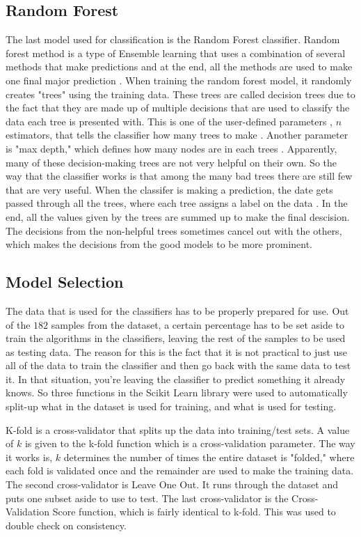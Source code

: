 \documentclass[conference,compsoc]{IEEEtran}
\begin{document}
\subsection{Random Forest}
The last model used for classification is the Random Forest classifier. Random forest method is a type of Ensemble learning that uses a combination of several methods that make predictions and at the end, all the methods are used to make one final major prediction \cite{random}. When training the random forest model, it randomly creates "trees" using the training data. 
These trees are called decision trees due to the fact that they are made up of multiple decisions that are used to classify the data each tree is presented with. This is one of the user-defined parameters , $n$ estimators, that tells the classifier how many trees to make \cite{skforest}. Another parameter is "max depth," which defines how many nodes are in each trees \cite{skforest}. Apparently, many of these decision-making trees are not very helpful on their own. So the way that the classifier works is that among the many bad trees there are still few that are very useful. When the classifer is making a prediction, the date gets passed through all the trees, where each tree assigns a label on the data \cite{random}. In the end, all the values given by the trees are summed up to make the final descision. The decisions from the non-helpful trees sometimes cancel out with the others, which makes the decisions from the good models to be more prominent.

\subsection{Model Selection}
The data that is used for the classifiers has to be properly prepared for use. Out of the $182$ samples from the dataset, a certain percentage has to be set aside to train the algorithms in the classifiers, leaving the rest of the samples to be used as testing data. The reason for this is the fact that it is not practical to just use all of the data to train the classifier and then go back with the same data to test it. In that situation, you're leaving the classifier to predict something it already knows. 
So three functions in the Scikit Learn library were used to automatically split-up what in the dataset is used for training, and what is used for testing. 

K-fold is a cross-validator that splits up the data into training/test sets. A value of $k$ is given to the k-fold function which is a cross-validation parameter. The way it works is, $k$ determines the number of times the entire dataset is "folded," where each fold is validated once and the remainder are used to make the training data. 
The second cross-validator is Leave One Out. It runs through the dataset and puts one subset aside to use to test. The last cross-validator is the Cross-Validation Score function, which is fairly identical to k-fold. This was used to double check on consistency.
\end{document}
